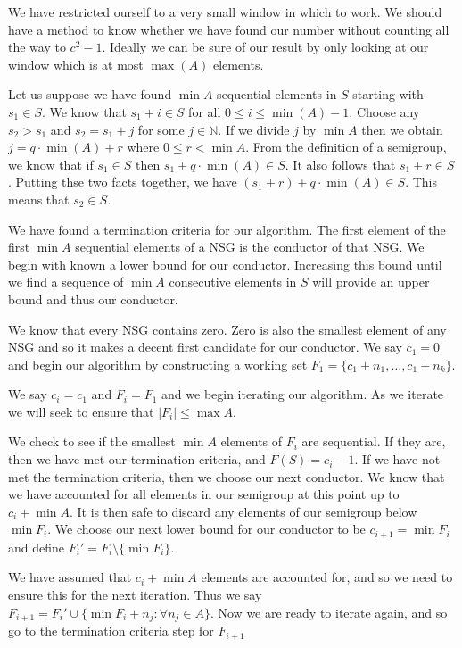 \documentclass[11pt]{amsart}
\theoremstyle{plain}
\theoremstyle{definition}
\begin{document}
We have restricted ourself to a very small window in which to work. We should have a method to know whether we have found our number without counting all the way to $c^2-1$.
Ideally we can be sure of our result by only looking at our window which is at most $\max(A)$ elements.

Let us suppose we have found $\min A$ sequential elements in $S$ starting with $s_1\in S$.
We know that $s_1+i\in S$ for all $0\le i\le \min(A)-1$.
Choose any $s_2>s_1$ and $s_2=s_1+j$ for some $j\in \mathbb{N}$.
If we divide $j$ by $\min A$ then we obtain $j=q\cdot\min(A)+r$ where $0\le r<\min A$.
From the definition of a semigroup, we know that if $s_1\in S$ then $s_1+q\cdot\min(A)\in S$.
It also follows that $s_1+r\in S$.
Putting thse two facts together, we have $(s_1+r)+q\cdot\min(A)\in S$.
This means that $s_2\in S$.

We have found a termination criteria for our algorithm.
The first element of the first $\min A$ sequential elements of a NSG is the conductor of that NSG.  We begin with known a lower bound for our conductor.
Increasing this bound until we find a sequence of $\min A$ consecutive elements in $S$ will provide an upper bound and thus our conductor.

We know that every NSG contains zero.
Zero is also the smallest element of any NSG and so it makes a decent first candidate for our conductor.
We say $c_1=0$ and begin our algorithm by constructing a working set $F_1=\{c_1+n_1,\dots, c_1+n_k\}$.

We say $c_i=c_1$ and $F_i=F_1$ and we begin iterating our algorithm.
As we iterate we will seek to ensure that $|F_i|\le \max A$.

We check to see if the smallest $\min A$ elements of $F_i$ are sequential.
If they are, then we have met our termination criteria, and $F(S)=c_i-1$.
If we have not met the termination criteria, then we choose our next conductor.
We know that we have accounted for all elements in our semigroup at this point up to $c_i+\min A$.
It is then safe to discard any elements of our semigroup below $\min F_i$.
We choose our next lower bound for our conductor to be $c_{i+1}=\min F_i$ and define $F_i'=F_i\setminus\{\min F_i\}$.

We have assumed that $c_i+\min A$ elements are accounted for, and so we need to ensure this for the next iteration.
Thus we say $F_{i+1}=F_i'\cup \{\min F_i+n_j:\forall n_j\in A\}$. Now we are ready to iterate again, and so go to the termination criteria step for $F_{i+1}$
\end{document}
